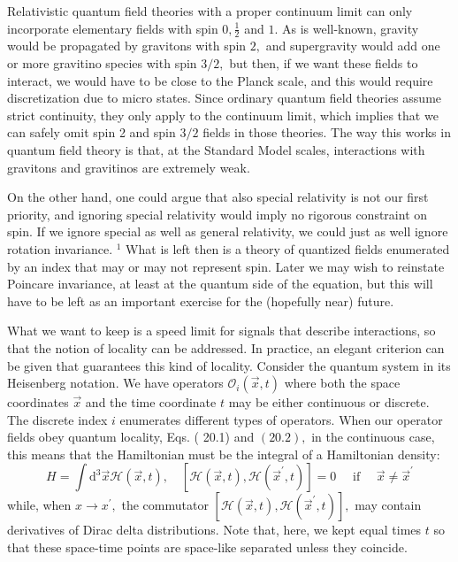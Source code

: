 \documentclass[main.tex]{subfiles}
\begin{document}
Relativistic quantum field theories with a proper continuum limit can only incorporate elementary fields with spin $0, \frac{1}{2}$ and $1 .$ As is well-known, gravity would be propagated by gravitons with spin $2,$ and supergravity would add one or more gravitino species with spin $3 / 2,$ but then, if we want these fields to interact, we would have to be close to the Planck scale, and this would require discretization due to micro states. Since ordinary quantum field theories assume strict continuity, they only apply to the continuum limit, which implies that we can safely omit spin 2 and spin $3 / 2$ fields in those theories. The way this works in quantum field theory is that, at the Standard Model scales, interactions with gravitons and gravitinos are extremely weak.

On the other hand, one could argue that also special relativity is not our first priority, and ignoring special relativity would imply no rigorous constraint on spin. If we ignore special as well as general relativity, we could just as well ignore rotation invariance. $^{1}$ What is left then is a theory of quantized fields enumerated by an index that may or may not represent spin. Later we may wish to reinstate Poincare invariance, at least at the quantum side of the equation, but this will have to be left as an important exercise for the (hopefully near) future.

What we want to keep is a speed limit for signals that describe interactions, so that the notion of locality can be addressed. In practice, an elegant criterion can be given that guarantees this kind of locality. Consider the quantum system in its Heisenberg notation. We have operators $\mathcal{O}_{i}(\vec{x}, t)$ where both the space coordinates $\vec{x}$ and the time coordinate $t$ may be either continuous or discrete. The discrete index $i$ enumerates different types of operators. When our operator fields obey quantum locality, Eqs. ( 20.1) and $(20.2),$ in the continuous case, this means that the Hamiltonian must be the integral of a Hamiltonian density:
$$
H=\int \mathrm{d}^{3} \vec{x} \mathcal{H}(\vec{x}, t), \quad\left[\mathcal{H}(\vec{x}, t), \mathcal{H}\left(\vec{x}^{\prime}, t\right)\right]=0 \quad \text { if } \quad \vec{x} \neq \vec{x}^{\prime}
$$
while, when $x \rightarrow x^{\prime},$ the commutator $\left[\mathcal{H}(\vec{x}, t), \mathcal{H}\left(\vec{x}^{\prime}, t\right)\right],$ may contain derivatives
of Dirac delta distributions. Note that, here, we kept equal times $t$ so that these space-time points are space-like separated unless they coincide.
\end{document}
